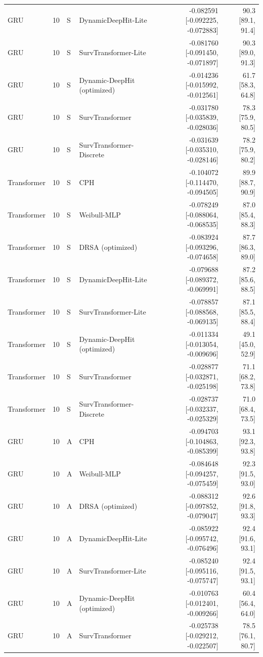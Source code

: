 \begin{longtable}{lll p{3.0cm} rr}
GRU & 10 & S & DynamicDeepHit-Lite & -0.082591 [-0.092225, -0.072883] & 90.3 [89.1, 91.4]\\
GRU & 10 & S & SurvTransformer-Lite & -0.081760 [-0.091450, -0.071897] & 90.3 [89.0, 91.3]\\
GRU & 10 & S & Dynamic-DeepHit (optimized) & -0.014236 [-0.015992, -0.012561] & 61.7 [58.3, 64.8]\\
GRU & 10 & S & SurvTransformer & -0.031780 [-0.035839, -0.028036] & 78.3 [75.9, 80.5]\\
GRU & 10 & S & SurvTransformer-Discrete & -0.031639 [-0.035310, -0.028146] & 78.2 [75.9, 80.2]\\
Transformer & 10 & S & CPH & -0.104072 [-0.114470, -0.094505] & 89.9 [88.7, 90.9]\\
Transformer & 10 & S & Weibull-MLP & -0.078249 [-0.088064, -0.068535] & 87.0 [85.4, 88.3]\\
Transformer & 10 & S & DRSA (optimized) & -0.083924 [-0.093296, -0.074658] & 87.7 [86.3, 89.0]\\
Transformer & 10 & S & DynamicDeepHit-Lite & -0.079688 [-0.089372, -0.069991] & 87.2 [85.6, 88.5]\\
Transformer & 10 & S & SurvTransformer-Lite & -0.078857 [-0.088568, -0.069135] & 87.1 [85.5, 88.4]\\
Transformer & 10 & S & Dynamic-DeepHit (optimized) & -0.011334 [-0.013054, -0.009696] & 49.1 [45.0, 52.9]\\
Transformer & 10 & S & SurvTransformer & -0.028877 [-0.032871, -0.025198] & 71.1 [68.2, 73.8]\\
Transformer & 10 & S & SurvTransformer-Discrete & -0.028737 [-0.032337, -0.025329] & 71.0 [68.4, 73.5]\\
GRU & 10 & A & CPH & -0.094703 [-0.104863, -0.085399] & 93.1 [92.3, 93.8]\\
GRU & 10 & A & Weibull-MLP & -0.084648 [-0.094257, -0.075459] & 92.3 [91.5, 93.0]\\
GRU & 10 & A & DRSA (optimized) & -0.088312 [-0.097852, -0.079047] & 92.6 [91.8, 93.3]\\
GRU & 10 & A & DynamicDeepHit-Lite & -0.085922 [-0.095742, -0.076496] & 92.4 [91.6, 93.1]\\
GRU & 10 & A & SurvTransformer-Lite & -0.085240 [-0.095116, -0.075747] & 92.4 [91.5, 93.1]\\
GRU & 10 & A & Dynamic-DeepHit (optimized) & -0.010763 [-0.012401, -0.009266] & 60.4 [56.4, 64.0]\\
GRU & 10 & A & SurvTransformer & -0.025738 [-0.029212, -0.022507] & 78.5 [76.1, 80.7]\\

\end{longtable}
